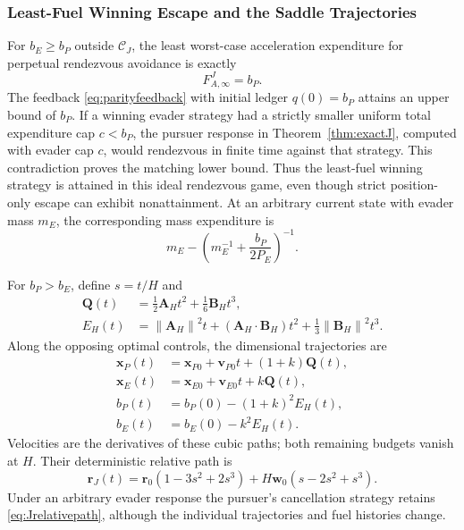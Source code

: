 \documentclass[journal,a4paper]{IEEEtran}
\newcommand{\C}{\mathcal C}
\newcommand{\norm}[1]{\left\|#1\right\|}
\begin{document}
\subsubsection{Least-Fuel Winning Escape and the Saddle Trajectories}
For $b_E\ge b_P$ outside $\C_J$, the least worst-case acceleration expenditure for perpetual rendezvous avoidance is exactly
\begin{equation}
 \boxed{F_{A,\infty}^J=b_P.}
 \label{eq:Jescapecost}
\end{equation}
The feedback \eqref{eq:parityfeedback} with initial ledger $q(0)=b_P$ attains an upper bound of $b_P$. If a winning evader strategy had a strictly smaller uniform total expenditure cap $c<b_P$, the pursuer response in Theorem~\ref{thm:exactJ}, computed with evader cap $c$, would rendezvous in finite time against that strategy. This contradiction proves the matching lower bound. Thus the least-fuel winning strategy is attained in this ideal rendezvous game, even though strict position-only escape can exhibit nonattainment. At an arbitrary current state with evader mass $m_E$, the corresponding mass expenditure is
\begin{equation}
 m_E-\left(m_E^{-1}+\frac{b_P}{2P_E}\right)^{-1}.
\end{equation}

For $b_P>b_E$, define $s=t/H$ and
\begin{align}
 \mathbf Q(t)&=\tfrac12\mathbf A_Ht^2+\tfrac16\mathbf B_Ht^3,\label{eq:QJ}\\
 E_H(t)&=\norm{\mathbf A_H}^2t+
       (\mathbf A_H\cdot\mathbf B_H)t^2+
       \tfrac13\norm{\mathbf B_H}^2t^3.\label{eq:EH}
\end{align}
Along the opposing optimal controls, the dimensional trajectories are
\begin{align}
 \mathbf x_P(t)&=\mathbf x_{P0}+\mathbf v_{P0}t+(1+k)\mathbf Q(t),\nonumber\\
 \mathbf x_E(t)&=\mathbf x_{E0}+\mathbf v_{E0}t+k\mathbf Q(t),\label{eq:Jsaddlepaths}\\
 b_P(t)&=b_P(0)-(1+k)^2E_H(t),\nonumber\\
 b_E(t)&=b_E(0)-k^2E_H(t).\nonumber
\end{align}
Velocities are the derivatives of these cubic paths; both remaining budgets vanish at $H$. Their deterministic relative path is
\begin{equation}
 \mathbf r_J(t)=\mathbf r_0(1-3s^2+2s^3)
                  +H\mathbf w_0(s-2s^2+s^3).
 \label{eq:Jrelativepath}
\end{equation}
Under an arbitrary evader response the pursuer's cancellation strategy retains \eqref{eq:Jrelativepath}, although the individual trajectories and fuel histories change.
\end{document}
